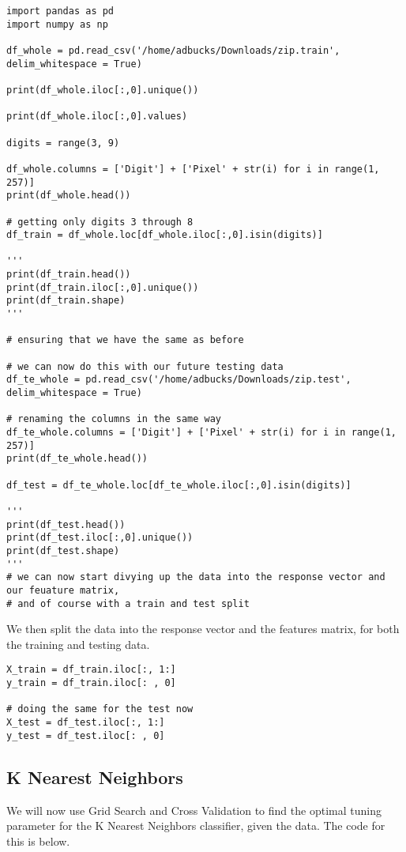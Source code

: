 \documentclass[12pt, letterpaper]{article}
\begin{document}
\begin{verbatim} 
import pandas as pd 
import numpy as np 

df_whole = pd.read_csv('/home/adbucks/Downloads/zip.train', delim_whitespace = True)

print(df_whole.iloc[:,0].unique())

print(df_whole.iloc[:,0].values)

digits = range(3, 9)

df_whole.columns = ['Digit'] + ['Pixel' + str(i) for i in range(1, 257)]
print(df_whole.head())

# getting only digits 3 through 8 
df_train = df_whole.loc[df_whole.iloc[:,0].isin(digits)]

'''
print(df_train.head()) 
print(df_train.iloc[:,0].unique())
print(df_train.shape)
'''

# ensuring that we have the same as before 

# we can now do this with our future testing data 
df_te_whole = pd.read_csv('/home/adbucks/Downloads/zip.test', delim_whitespace = True)

# renaming the columns in the same way 
df_te_whole.columns = ['Digit'] + ['Pixel' + str(i) for i in range(1, 257)]
print(df_te_whole.head()) 

df_test = df_te_whole.loc[df_te_whole.iloc[:,0].isin(digits)]

'''
print(df_test.head())
print(df_test.iloc[:,0].unique())
print(df_test.shape)
'''
# we can now start divying up the data into the response vector and our feuature matrix, 
# and of course with a train and test split 
\end{verbatim}

We then split the data into the response vector and the features matrix, for both the training and testing data. 

\begin{verbatim} 
X_train = df_train.iloc[:, 1:] 
y_train = df_train.iloc[: , 0]

# doing the same for the test now 
X_test = df_test.iloc[:, 1:]
y_test = df_test.iloc[: , 0]
\end{verbatim}

\subsection{K Nearest Neighbors} 

We will now use Grid Search and Cross Validation to find the optimal tuning parameter for the K Nearest Neighbors classifier, given the data. The code for this is below. 
\end{document}
